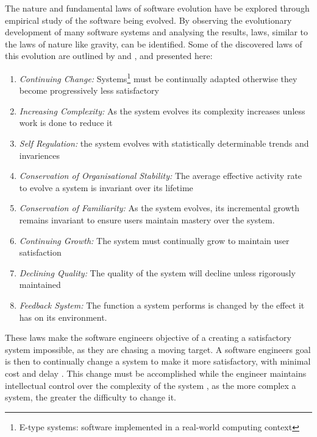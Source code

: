 The nature and fundamental laws of software evolution have be explored through empirical study of the software being evolved.
By observing the evolutionary development of many software systems and analysing the results, laws, similar to the laws of nature like gravity, can be identified.
Some of the discovered laws of this evolution are outlined by \cite{lehman1980} and \cite{lehman1997}, and presented here:

\begin{enumerate}
  \item \textit{Continuing Change:} Systems\footnote{E-type systems: software implemented in a real-world computing context} must be continually adapted 
  otherwise they become progressively less satisfactory
  \item \textit{Increasing Complexity:} As the system evolves its complexity increases unless work is done to reduce it
  \item \textit{Self Regulation:} the system evolves with statistically determinable trends and invariences
  \item \textit{Conservation of Organisational Stability:} The average effective activity rate to evolve a system is invariant over its lifetime
  \item \textit{Conservation of Familiarity:} As the system evolves, its incremental growth remains invariant to ensure users maintain mastery over the system.
  \item \textit{Continuing Growth:} The system must continually grow to maintain user satisfaction
  \item \textit{Declining Quality:} The quality of the system will decline unless rigorously maintained
  \item \textit{Feedback System:} The function a system performs is changed by the effect it has on its environment.
\end{enumerate}

These laws make the software engineers objective of a creating a satisfactory system impossible, as they are chasing a moving target.
A software engineers goal is then to continually change a system to make it more satisfactory, with minimal cost and delay \citep{Lehman2006}.
This change must be accomplished while the engineer maintains intellectual control over the complexity of the system \citep{Brooks1975}, 
as the more complex a system, the greater the difficulty to change it.

